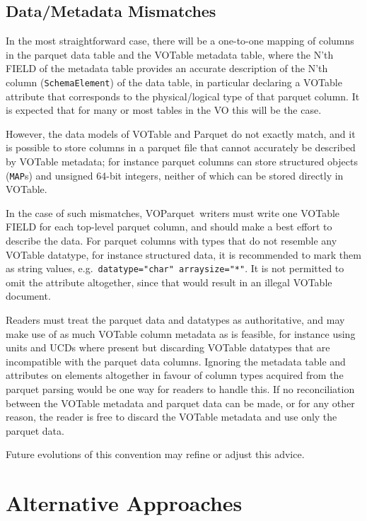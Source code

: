 \documentclass[11pt,a4paper]{ivoa}
\newcommand{\voparquet}{VOParquet}
\begin{document}
\subsection{Data/Metadata Mismatches}

In the most straightforward case, there will be a one-to-one mapping
of columns in the parquet data table and the VOTable metadata table,
where the N'th FIELD of the metadata table provides an accurate
description of the N'th column ({\tt SchemaElement}) of the data table,
in particular declaring a VOTable  attribute that
corresponds to the physical/logical type of that parquet column.
It is expected that for many or most tables in the VO this will be the case.

However, the data models of VOTable and Parquet do not exactly match,
and it is possible to store columns in a parquet file that cannot
accurately be described by VOTable metadata;
for instance parquet columns can store structured objects ({\tt MAP}s) and
unsigned 64-bit integers, neither of which can be stored directly
in VOTable.

In the case of such mismatches,
\voparquet\ writers must write one VOTable FIELD
for each top-level parquet column,
and should make a best effort to describe the data.
For parquet columns with types that do not resemble any VOTable datatype,
for instance structured data, it is recommended to mark them as
string values, e.g.\ \verb|datatype="char" arraysize="*"|.
It is not permitted to omit the  attribute altogether,
since that would result in an illegal VOTable document.

Readers must treat the parquet data and datatypes as authoritative,
and may make use of as much VOTable column metadata as is feasible,
for instance using units and UCDs where present but discarding
VOTable datatypes that are incompatible with the parquet data columns.
Ignoring the metadata table  and  attributes
on  elements altogether in favour of column types acquired
from the parquet parsing would be one way for readers to handle this.
If no reconciliation between the VOTable metadata and
parquet data can be made, or for any other reason,
the reader is free to discard the VOTable metadata and use only
the parquet data.

Future evolutions of this convention may refine or adjust this advice.

\section{Alternative Approaches}
\end{document}
